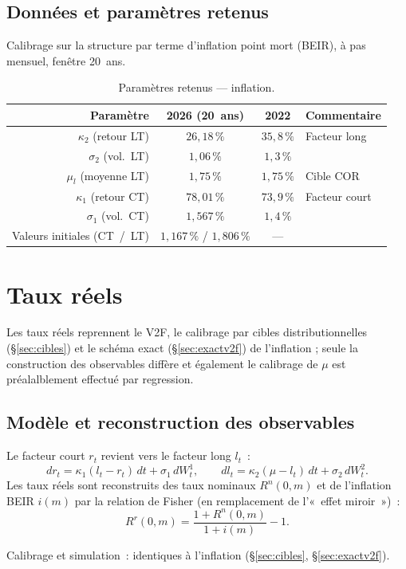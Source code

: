 \documentclass[11pt,a4paper]{article}
\newcommand{\tablehead}[1]{{\sffamily\bfseries\color{nxnavy}#1}}
\begin{document}
\subsection{Données et paramètres retenus}
Calibrage sur la structure par terme d'inflation point mort (BEIR), à pas mensuel, fenêtre 20~ans.
\begin{table}[H]
\centering\small
\renewcommand{\arraystretch}{1.4}\setlength{\tabcolsep}{6pt}
\begin{tabularx}{\linewidth}{R c c >{\raggedright\arraybackslash}p{3.4cm}}
\toprule
\tablehead{Paramètre} & \tablehead{2026 (20~ans)} & \tablehead{2022} & \tablehead{Commentaire} \\
\midrule
{} $\kappa_2$ (retour LT) & $26{,}18\,\%$ & $35{,}8\,\%$ & Facteur long \\
$\sigma_2$ (vol.\ LT) & $1{,}06\,\%$ & $1{,}3\,\%$ & \\
 $\mu_l$ (moyenne LT) & $1{,}75\,\%$ & $1{,}75\,\%$ & Cible COR \\
$\kappa_1$ (retour CT) & $78{,}01\,\%$ & $73{,}9\,\%$ & Facteur court \\
 $\sigma_1$ (vol.\ CT) & $1{,}567\,\%$ & $1{,}4\,\%$ & \\
Valeurs initiales (CT~/~LT) & $1{,}167\,\%$ / $1{,}806\,\%$ & --- & \\
\bottomrule
\end{tabularx}
\caption{Paramètres retenus --- inflation.}
\end{table}

\clearpage
\section{Taux réels}
Les taux réels reprennent le V2F, le calibrage par cibles distributionnelles (\S\ref{sec:cibles}) et le schéma exact (\S\ref{sec:exactv2f}) de l'inflation ; seule la construction des observables diffère et également  le calibrage de $\mu$ est préalalblement effectué par regression.

\subsection{Modèle et reconstruction des observables}
\begin{definitionbox}
Le facteur court $r_t$ revient vers le facteur long $l_t$~:
\[
dr_t=\kappa_1(l_t-r_t)\,dt+\sigma_1\,dW_t^1,\qquad dl_t=\kappa_2(\mu-l_t)\,dt+\sigma_2\,dW_t^2 .
\]
Les taux réels sont reconstruits des taux nominaux $R^n(0,m)$ et de l'inflation BEIR $i(m)$ par la relation de Fisher (en remplacement de l'«~effet miroir~»)~:
\[
R^{r}(0,m)=\frac{1+R^{n}(0,m)}{1+i(m)}-1 .
\]
\end{definitionbox}
Calibrage et simulation~: identiques à l'inflation (\S\ref{sec:cibles}, \S\ref{sec:exactv2f}).
\end{document}

